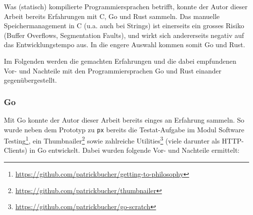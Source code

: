 Was (statisch) kompilierte Programmiersprachen betrifft, konnte der Autor dieser Arbeit bereits Erfahrungen mit C, Go und Rust sammeln. Das manuelle Speichermanagement in C (u.a. auch bei Strings) ist einerseits ein grosses Risiko (Buffer Overflows, Segmentation Faults), und wirkt sich andererseits negativ auf das Entwicklungstempo aus. In die engere Auswahl kommen somit Go und Rust.

Im Folgenden werden die gemachten Erfahrungen und die dabei empfundenen Vor- und Nachteile mit den Programmiersprachen Go und Rust einander gegenübergestellt.

\subsubsection{Go}

Mit Go konnte der Autor dieser Arbeit bereits einges an Erfahrung sammeln. So wurde neben dem Prototyp zu \texttt{px} bereits die Testat-Aufgabe im Modul Software Testing\footnote{\url{https://github.com/patrickbucher/getting-to-philosophy}}, ein Thumbnailer\footnote{\url{https://github.com/patrickbucher/thumbnailer}} sowie zahlreiche Utilities\footnote{\url{https://github.com/patrickbucher/go-scratch}} (viele darunter als HTTP-Clients) in Go entwickelt. Dabei wurden folgende Vor- und Nachteile ermittelt:

